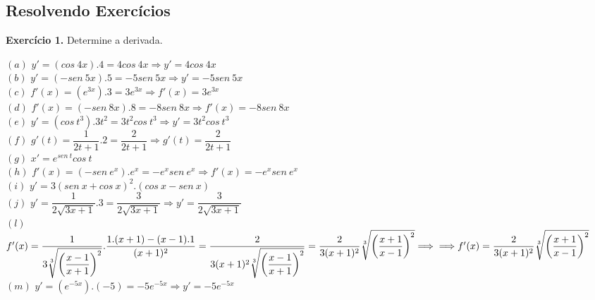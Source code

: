 \documentclass[12pt,openright,twoside,a4paper]{article}
\theoremstyle{definition}
\begin{document}
	\pagebreak
	\subsection{Resolvendo Exercícios}
	
	\textbf{Exercício 1.} Determine a derivada.
	
	$(a)$ $y' = (cos \ 4x).4 = 4cos \ 4x \Longrightarrow y' = 4cos \ 4x$ \\
		
		$(b)$ $y' = (-sen \ 5x).5 = -5sen \ 5x \Longrightarrow y' = -5sen \ 5x$ \\
		
		$(c)$ $f'(x) = (e^{3x}).3 = 3e^{3x} \Longrightarrow f'(x) = 3e^{3x}$ \\
		
		$(d)$ $f'(x) = (-sen \ 8x).8 = -8sen \ 8x \Longrightarrow f'(x) = -8sen \ 8x$ \\
		
		$(e)$ $y' = (cos \ t^{3}).3t^{2} = 3t^{2}cos \ t^{3} \Longrightarrow y' = 3t^{2}cos \ t^{3}$ \\
		
		$(f)$ $g'(t) = \dfrac{1}{2t + 1}.2 = \dfrac{2}{2t + 1} \Longrightarrow g'(t) = \dfrac{2}{2t + 1}$ \\
		
		$(g)$ $x' = e^{sen \ t}cos \ t$ \\
		
		$(h)$ $f'(x) = (-sen \ e^{x}).e^{x} = -e^{x}sen \ e^{x} \Longrightarrow f'(x) = -e^{x}sen \ e^{x}$ \\
		
		$(i)$ $y' = 3(sen \ x + cos \ x)^{2}.(cos \ x - sen \ x)$ \\
		
		$(j)$ $y' = \dfrac{1}{2\sqrt{3x + 1}}.3 = \dfrac{3}{2\sqrt{3x + 1}} \Longrightarrow y' = \dfrac{3}{2\sqrt{3x + 1}}$ \\
		
		$(l)$ $f'(x) = \dfrac{1}{3\sqrt[3]{\biggl( \dfrac{x - 1}{x + 1} \biggl)^{2}}}.\dfrac{1.(x + 1) - (x - 1).1}{(x + 1)^{2}} = \dfrac{2}{3(x + 1)^{2}\sqrt[3]{\biggl( \dfrac{x - 1}{x + 1} \biggl)^{2}}} = \dfrac{2}{3(x + 1)^{2}}\sqrt[3]{\biggl( \dfrac{x + 1}{x - 1} \biggl)^{2}} \Longrightarrow \\ \\ \Longrightarrow f'(x) = \dfrac{2}{3(x + 1)^{2}}\sqrt[3]{\biggl( \dfrac{x + 1}{x - 1} \biggl)^{2}}$ \\
		
		$(m)$ $y' = (e^{-5x}).(-5) = -5e^{-5x} \Longrightarrow y' = -5e^{-5x}$ \\
		
\end{document}
